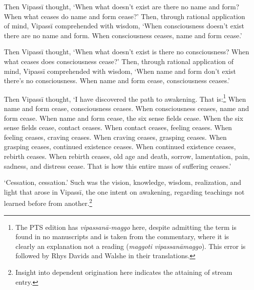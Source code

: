 \documentclass[12pt,openany]{book}%
\begin{document}
Then \textsanskrit{Vipassī} thought, ‘When what doesn’t exist are there no name and form? When what ceases do name and form cease?’ Then, through rational application of mind, \textsanskrit{Vipassī} comprehended with wisdom, ‘When consciousness doesn’t exist there are no name and form. When consciousness ceases, name and form cease.’ 

Then \textsanskrit{Vipassī} thought, ‘When what doesn’t exist is there no consciousness? When what ceases does consciousness cease?’ Then, through rational application of mind, \textsanskrit{Vipassī} comprehended with wisdom, ‘When name and form don’t exist there’s no consciousness. When name and form cease, consciousness ceases.’ 

Then \textsanskrit{Vipassī} thought, ‘I have discovered the path to awakening. That is:\footnote{The PTS edition has \textit{\textsanskrit{vipassanā}-maggo} here, despite admitting the term is found in no manuscripts and is taken from the commentary, where it is clearly an explanation not a reading (\textit{maggoti \textsanskrit{vipassanāmaggo}}). This error is followed by Rhys Davids and Walshe in their translations. } When name and form cease, consciousness ceases. When consciousness ceases, name and form cease. When name and form cease, the six sense fields cease. When the six sense fields cease, contact ceases. When contact ceases, feeling ceases. When feeling ceases, craving ceases. When craving ceases, grasping ceases. When grasping ceases, continued existence ceases. When continued existence ceases, rebirth ceases. When rebirth ceases, old age and death, sorrow, lamentation, pain, sadness, and distress cease. That is how this entire mass of suffering ceases.’ 

‘Cessation, cessation.’ Such was the vision, knowledge, wisdom, realization, and light that arose in \textsanskrit{Vipassī}, the one intent on awakening, regarding teachings not learned before from another.\footnote{Insight into dependent origination here indicates the attaining of stream entry. } 
\end{document}
